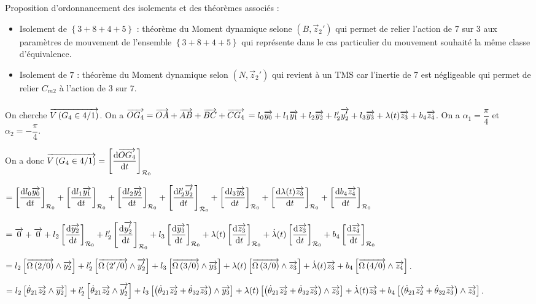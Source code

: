 \documentclass[10pt,fleqn]{article} %
\begin{document}
Proposition d'ordonnancement des isolements et des théorèmes associés : 
\begin{itemize}
\item Isolement de $\left\{3+8+4+5\right\}$ : théorème du Moment dynamique selone $\left(B,\overrightarrow{z}_2'\right)$ qui permet de relier l'action de 7 sur 3 aux paramètres de mouvement de l'ensemble $\left\{3+8+4+5\right\}$ qui représente dans le cas particulier du mouvement souhaité la même classe d'équivalence.
\item Isolement de $7$ : théorème du Moment dynamique selon $\left(N,\overrightarrow{z}_2'\right)$ qui revient à un TMS car l'inertie de 7 est négligeable qui permet de relier $C_{m2}$ à l'action de 3 sur 7.
\end{itemize}
\subparagraph{}%
On cherche $\overrightarrow{V\left( {G_4} \in {4}/{1}\right)}$. On a $\overrightarrow{OG_4}=\overrightarrow{OA}+\overrightarrow{AB}+\overrightarrow{BC}+\overrightarrow{CG_4}$ $=l_0\overrightarrow{y_0}+l_1\overrightarrow{y_1}+l_2\overrightarrow{y_2}+l_2'\overrightarrow{y_2'}+l_3\overrightarrow{y_3}+\lambda(t)\overrightarrow{z_3}+b_4\overrightarrow{z_4}$.
On a $\alpha_1=\dfrac{\pi}{4}$ et $\alpha_2=-\dfrac{\pi}{4}$.

On a donc $\overrightarrow{V\left( {G_4} \in {4}/{1}\right)}= \left[\dfrac{\text{d} \overrightarrow{OG_4}}{\text{d} t}\right]_{\mathcal{R}_{0}} $ 

$= 
\left[\dfrac{\text{d} l_0\overrightarrow{y_0}}{\text{d} t}\right]_{\mathcal{R}_{0}}+
\left[\dfrac{\text{d} l_1\overrightarrow{y_1}}{\text{d} t}\right]_{\mathcal{R}_{0}}+
\left[\dfrac{\text{d} l_2\overrightarrow{y_2}}{\text{d} t}\right]_{\mathcal{R}_{0}}+
\left[\dfrac{\text{d} l_2'\overrightarrow{y_2'}}{\text{d} t}\right]_{\mathcal{R}_{0}}+
\left[\dfrac{\text{d} l_3\overrightarrow{y_3}}{\text{d} t}\right]_{\mathcal{R}_{0}}+
\left[\dfrac{\text{d} \lambda(t)\overrightarrow{z_3}}{\text{d} t}\right]_{\mathcal{R}_{0}}+
\left[\dfrac{\text{d} b_4\overrightarrow{z_4}}{\text{d} t}\right]_{\mathcal{R}_{0}}$

$= 
\overrightarrow{0}+
\overrightarrow{0}+
l_2\left[\dfrac{\text{d} \overrightarrow{y_2}}{\text{d} t}\right]_{\mathcal{R}_{0}}+
l_2'\left[\dfrac{\text{d} \overrightarrow{y_2'}}{\text{d} t}\right]_{\mathcal{R}_{0}}+
l_3\left[\dfrac{\text{d} \overrightarrow{y_3}}{\text{d} t}\right]_{\mathcal{R}_{0}}+
\lambda(t)\left[\dfrac{\text{d} \overrightarrow{z_3}}{\text{d} t}\right]_{\mathcal{R}_{0}}+
\dot{\lambda}(t)\left[\dfrac{\text{d} \overrightarrow{z_3}}{\text{d} t}\right]_{\mathcal{R}_{0}}+
b_4\left[\dfrac{\text{d} \overrightarrow{z_4}}{\text{d} t}\right]_{\mathcal{R}_{0}}$

$= 
l_2\left[ \overrightarrow{\Omega\left( {2}/{0}\right)} \wedge \overrightarrow{y_2} \right]+
l_2'\left[ \overrightarrow{\Omega\left( {2'}/{0}\right)} \wedge \overrightarrow{y_2'} \right]+
l_3\left[ \overrightarrow{\Omega\left( {3}/{0}\right)} \wedge \overrightarrow{y_3} \right]+
\lambda(t)\left[ \overrightarrow{\Omega\left( {3}/{0}\right)} \wedge \overrightarrow{z_3} \right]+
\dot{\lambda}(t)\overrightarrow{z_3}+
b_4\left[ \overrightarrow{\Omega\left( {4}/{0}\right)} \wedge \overrightarrow{z_4} \right]$. 

$= 
l_2\left[ \dot{\theta}_{21}\overrightarrow{z_2} \wedge \overrightarrow{y_2} \right]+
l_2'\left[ \dot{\theta}_{21}\overrightarrow{z_2} \wedge \overrightarrow{y_2'} \right]+
l_3\left[ \left(\dot{\theta}_{21}\overrightarrow{z_2}+\dot{\theta}_{32}\overrightarrow{z_3} \right) \wedge \overrightarrow{y_3} \right]+
\lambda(t)\left[ \left(\dot{\theta}_{21}\overrightarrow{z_2}+\dot{\theta}_{32}\overrightarrow{z_3} \right) \wedge \overrightarrow{z_3} \right]+
\dot{\lambda}(t)\overrightarrow{z_3}+
b_4\left[ \left(\dot{\theta}_{21}\overrightarrow{z_2}+\dot{\theta}_{32}\overrightarrow{z_3} \right) \wedge \overrightarrow{z_3} \right]$. 
\end{document}
